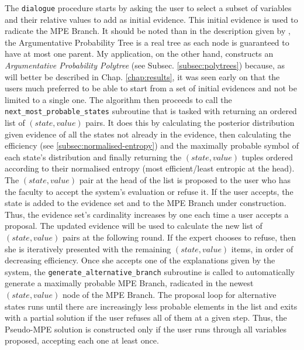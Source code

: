 The \texttt{dialogue} procedure starts by asking the user to select a subset of variables and their relative values to add as initial evidence.
This initial evidence is used to radicate the MPE Branch.
It should be noted than in the description given by \cite{Butz2018}, the Argumentative Probability Tree is a real tree as each node is guaranteed to have at most one parent.
My application, on the other hand, constructs an \textit{Argumentative Probability Polytree} (see Subsec. \ref{subsec:polytrees}) because, as will better be described in Chap. \ref{chap:results}, it was seen early on that the users much preferred to be able to start from a set of initial evidences and not be limited to a single one.
The algorithm then proceeds to call the \texttt{next\_most\_probable\_states} subroutine that is tasked with returning an ordered list of $(state,value)$ pairs.
It does this by calculating the posterior distribution given evidence of all the states not already in the evidence, then calculating the efficiency (see \ref{subsec:normalised-entropy}) and the maximally probable symbol of each state's distribution and finally returning the $(state,value)$ tuples ordered according to their normalised entropy (most efficient/least entropic at the head).
The $(state,value)$ pair at the head of the list is proposed to the user who has the faculty to accept the system's evaluation or refuse it.
If the user accepts, the state is added to the evidence set and to the MPE Branch under construction.
Thus, the evidence set's cardinality increases by one each time a user accepts a proposal.
The updated evidence will be used to calculate the new list of $(state,value)$ pairs at the following round.
If the expert chooses to refuse, then she is iteratively presented with the remaining $(state,value)$ items, in order of decreasing efficiency. 
Once she accepts one of the explanations given by the system, the \texttt{generate\_alternative\_branch} subroutine is called to automatically generate a maximally probable MPE Branch, radicated in the newest $(state,value)$ node of the MPE Branch.
The proposal loop for alternative states runs until there are increasingly less probable elements in the list and exits with a partial solution if the user refuses all of them at a given step.
Thus, the Pseudo-MPE solution is constructed only if the user runs through all variables proposed, accepting each one at least once.

